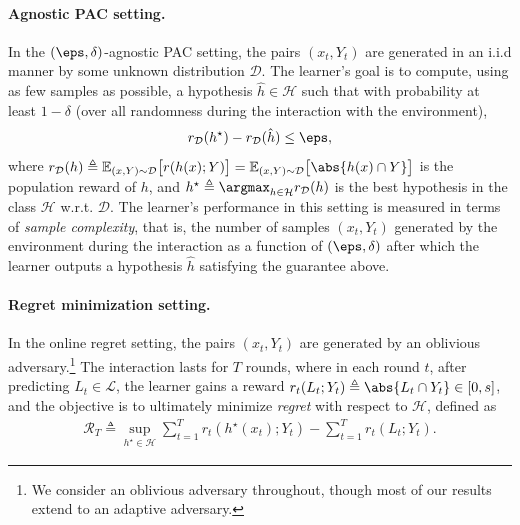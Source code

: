 \documentclass[11pt]{article}
\newcommand{\eqdef}{\triangleq}
\newcommand{\bbE}{\boldsymbol{\mathbb{E}}}
\renewcommand{\E}{\bbE}
\newcommand{\truelab}{Y}
\newcommand{\predlist}{L}
\newcommand{\rew}{r}
\newcommand{\calX}{\mathcal{X}}
\newcommand{\calY}{\mathcal{Y}}
\newcommand{\calH}{\mathcal{H}}
\newcommand{\calD}{\mathcal{D}}
\newcommand{\calL}{\mathcal{L}}
\newcommand{\regret}{\mathcal{R}}
\theoremstyle{plain}
\begin{document}
\paragraph{Agnostic PAC setting.} 
% 
In the $(\eps,\delta)$-agnostic PAC setting, the pairs $(x_t,\truelab_t)$ are generated in an i.i.d manner by some unknown distribution $\calD$. The learner's goal is to compute, using as few samples as possible, a hypothesis $\hat h \in \calH$ such that with probability at least $1 - \delta$ (over all randomness during the interaction with the environment),
\begin{align*}
    \rew_\calD(h^\star) - \rew_\calD(\hat h) \leq \eps,
\end{align*}
where $\rew_\calD(h) \eqdef \E_{(x,\truelab) \sim \calD} \big[\rew(h(x);\truelab) \big] = \E_{(x,\truelab) \sim \calD} \big[\abs{h(x) \cap \truelab} \big]$ is the population reward of $h$, and $h^\star \eqdef \argmax_{h \in \calH} \rew_\calD(h)$ is the best hypothesis in the class $\calH$ w.r.t. $\calD$. The learner's performance in this setting is measured in terms of \emph{sample complexity}, that is, the number of samples $(x_t,\truelab_t)$ generated by the environment during the interaction as a function of $(\eps,\delta)$ after which the learner outputs a hypothesis $\hat h$ satisfying the guarantee above.

\paragraph{Regret minimization setting.} 
% 
In the online regret setting, the pairs $(x_t,\truelab_t)$ are generated by an oblivious adversary.\footnote{We consider an oblivious adversary throughout, though most of our results extend to an adaptive adversary.} 
The interaction lasts for $T$ rounds, where in each round $t$, after predicting $\predlist_t \in \calL$, the learner gains a reward $\rew_t(\predlist_t; \truelab_t) \eqdef \abs{\predlist_t \cap \truelab_t} \in [0,s]$, and the objective is to ultimately minimize \emph{regret} with respect to $\calH$, defined as
\begin{align*}
    \regret_T \eqdef \sup_{h^\star \in \calH} \sum_{t=1}^T \rew_t(h^\star(x_t); \truelab_t) - \sum_{t=1}^T \rew_t(\predlist_t; \truelab_t).
\end{align*}

\end{document}
